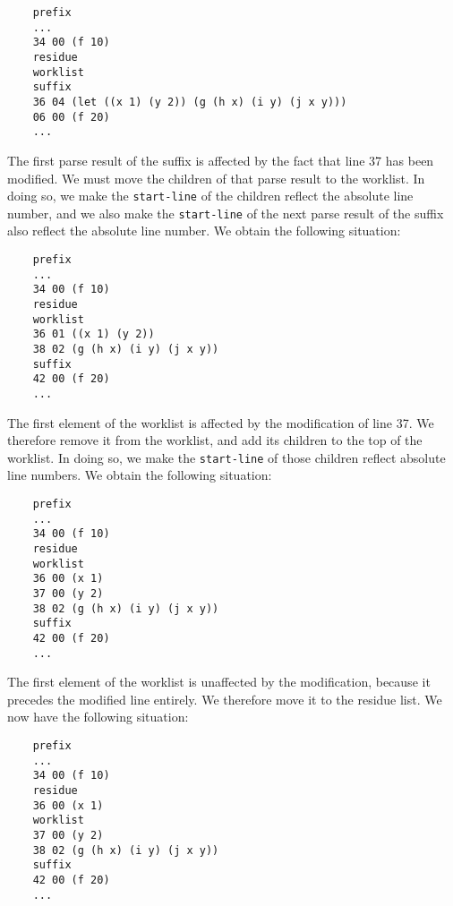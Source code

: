 \vspace{-5mm}
{\small\begin{verbatim}
    prefix
    ...
    34 00 (f 10)
    residue
    worklist
    suffix
    36 04 (let ((x 1) (y 2)) (g (h x) (i y) (j x y)))
    06 00 (f 20)
    ...
\end{verbatim}}
\vspace{-5mm}

The first parse result of the suffix is affected by the fact that line
37 has been modified.  We must move the children of that parse result
to the worklist.  In doing so, we make the \texttt{start-line} of the
children reflect the absolute line number, and we also make the
\texttt{start-line} of the next parse result of the suffix also
reflect the absolute line number.  We obtain the following situation:

\vspace{-5mm}
{\small\begin{verbatim}
    prefix
    ...
    34 00 (f 10)
    residue
    worklist
    36 01 ((x 1) (y 2))
    38 02 (g (h x) (i y) (j x y))
    suffix
    42 00 (f 20)
    ...
\end{verbatim}}
\vspace{-5mm}

The first element of the worklist is affected by the modification of
line 37.  We therefore remove it from the worklist, and add its
children to the top of the worklist.  In doing so, we make the
\texttt{start-line} of those children reflect absolute line numbers.
We obtain the following situation:

\vspace{-5mm}
{\small\begin{verbatim}
    prefix
    ...
    34 00 (f 10)
    residue
    worklist
    36 00 (x 1)
    37 00 (y 2)
    38 02 (g (h x) (i y) (j x y))
    suffix
    42 00 (f 20)
    ...
\end{verbatim}}
\vspace{-5mm}

The first element of the worklist is unaffected by the modification,
because it precedes the modified line entirely.  We therefore move it
to the residue list.  We now have the following situation:

\vspace{-5mm}
{\small\begin{verbatim}
    prefix
    ...
    34 00 (f 10)
    residue
    36 00 (x 1)
    worklist
    37 00 (y 2)
    38 02 (g (h x) (i y) (j x y))
    suffix
    42 00 (f 20)
    ...
\end{verbatim}}
\vspace{-5mm}

